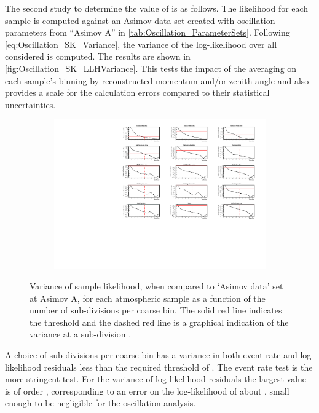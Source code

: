 The second study to determine the value of  is as follows. The likelihood for each sample is computed against an Asimov data set created with oscillation parameters from ``Asimov A'' in \autoref{tab:Oscillation_ParameterSets}. Following \autoref{eq:Oscillation_SK_Variance}, the variance of the log-likelihood over all considered  is computed. The results are shown in \autoref{fig:Oscillation_SK_LLHVariance}. This tests the impact of the averaging on each sample's binning by reconstructed momentum and/or zenith angle and also provides a scale for the calculation errors compared to their statistical uncertainties. 

\begin{figure}[h]
  \begin{subfigure}[t]{\textwidth}
    \includegraphics[width=\textwidth, trim={0mm 0mm 0mm 0mm}, clip,page=1]{Figures/Oscillation/EventRate_VarianceGraphs.pdf}
  \end{subfigure}
  \caption{Variance of sample likelihood, when compared to `Asimov data' set at Asimov A, for each atmospheric sample as a function of the number of sub-divisions per coarse bin. The solid red line indicates the  threshold and the dashed red line is a graphical indication of the variance at a sub-division .}
  \label{fig:Oscillation_SK_LLHVariance}
\end{figure}

A choice of  sub-divisions per coarse bin has a variance in both event rate and log-likelihood residuals less than the required threshold of . The event rate test is the more stringent test. For the variance of log-likelihood residuals the largest value is of order , corresponding to an error on the log-likelihood of about , small enough to be negligible for the oscillation analysis.

